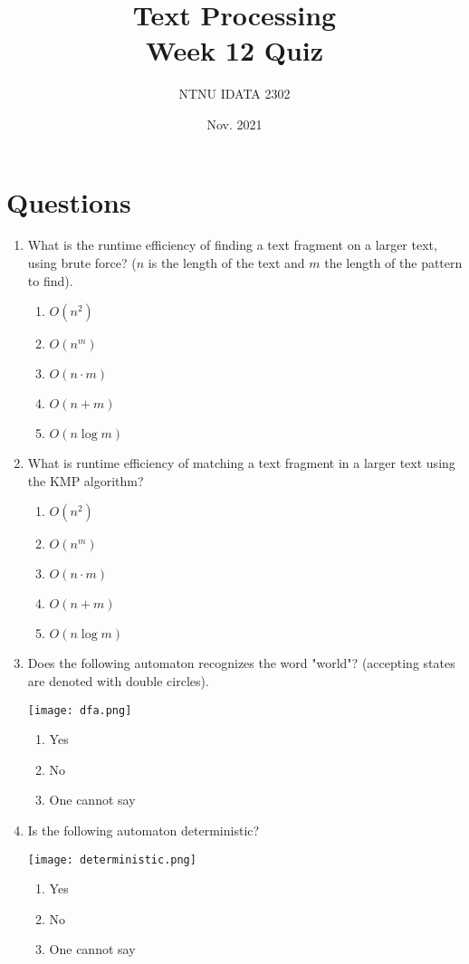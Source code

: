 \documentclass[11pt]{article}
\author{NTNU IDATA 2302}
\date{Nov. 2021}
\title{Text Processing\\\medskip
\large Week 12 Quiz}
\begin{document}
\maketitle


\section{Questions}
\label{sec:org050f686}

\begin{enumerate}
\item What is the runtime efficiency of finding a text fragment on a
larger text, using brute force? (\(n\) is the length of the text
and \(m\) the length of the pattern to find).
\begin{enumerate}
\item \(O(n^2)\)
\item \(O(n^m)\)
\item \(O(n\cdot m)\)
\item \(O(n + m)\)
\item \(O(n \log m)\)
\end{enumerate}

\item What is runtime efficiency of matching a text fragment in a
larger text using the KMP algorithm?
\begin{enumerate}
\item \(O(n^2)\)
\item \(O(n^m)\)
\item \(O(n\cdot m)\)
\item \(O(n + m)\)
\item \(O(n \log m)\)
\end{enumerate}

\item Does the following automaton recognizes the word "world"?
(accepting states are denoted with double circles).
\begin{center}
\texttt{[image: dfa.png]}
\end{center}

\begin{enumerate}
\item Yes
\item No
\item One cannot say
\end{enumerate}

\item Is the following automaton deterministic?
\begin{center}
\texttt{[image: deterministic.png]}
\end{center}
\begin{enumerate}
\item Yes
\item No
\item One cannot say
\end{enumerate}


\end{enumerate}
\end{document}
